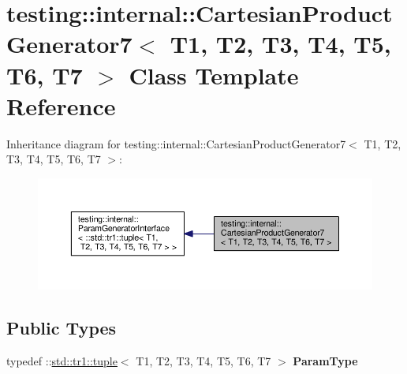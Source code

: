 \hypertarget{classtesting_1_1internal_1_1_cartesian_product_generator7}{}\section{testing\+:\+:internal\+:\+:Cartesian\+Product\+Generator7$<$ T1, T2, T3, T4, T5, T6, T7 $>$ Class Template Reference}
\label{classtesting_1_1internal_1_1_cartesian_product_generator7}


Inheritance diagram for testing\+:\+:internal\+:\+:Cartesian\+Product\+Generator7$<$ T1, T2, T3, T4, T5, T6, T7 $>$\+:
\nopagebreak
\begin{figure}[H]
\begin{center}
\leavevmode
\includegraphics[width=350pt]{classtesting_1_1internal_1_1_cartesian_product_generator7__inherit__graph}
\end{center}
\end{figure}
\subsection*{Public Types}
\begin{DoxyCompactItemize}
\item 
\mbox{\label{classtesting_1_1internal_1_1_cartesian_product_generator7_ac749b651dcf74699c59f548cd33e40c1}} 
typedef \+::\mbox{\hyperlink{classstd_1_1tr1_1_1tuple}{std\+::tr1\+::tuple}}$<$ T1, T2, T3, T4, T5, T6, T7 $>$ {\bfseries Param\+Type}
\end{DoxyCompactItemize}
